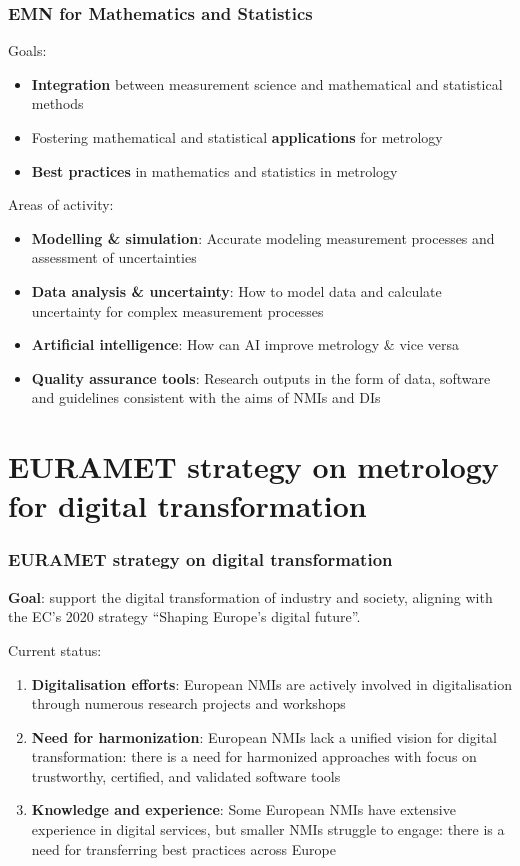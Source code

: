 \documentclass{beamer}
\begin{document}
    \begin{frame}
        \frametitle{EMN for Mathematics and Statistics}
        Goals:
        \begin{itemize}
            \item \textbf{Integration} between measurement science and mathematical and statistical methods
            \item Fostering mathematical and statistical \textbf{applications} for metrology
            \item \textbf{Best practices} in mathematics and statistics in metrology
        \end{itemize}
        Areas of activity:
        \begin{itemize}
            \item \textbf{Modelling \& simulation}: Accurate modeling measurement processes and assessment of uncertainties
            \item \textbf{Data analysis \& uncertainty}: How to model data and calculate uncertainty for complex measurement processes
            \item \textbf{Artificial intelligence}: How can AI improve metrology \& vice versa
            \item \textbf{Quality assurance tools}: Research outputs in the form of data, software and guidelines consistent with the aims of NMIs and DIs
        \end{itemize}
    \end{frame}


    \section{EURAMET strategy on metrology for digital transformation}

    \begin{frame}
        \frametitle{EURAMET strategy on digital transformation}
        \textbf{Goal}: support the digital transformation of industry and society, aligning with the EC's 2020 strategy ``Shaping Europe's digital future''.
        \bigskip

        Current status:
        \begin{enumerate}
            \item \textbf{Digitalisation efforts}: European NMIs are actively involved in digitalisation through numerous research projects and workshops
            \item \textbf{Need for harmonization}: European NMIs lack a unified vision for digital transformation:
            there is a need for harmonized approaches with focus on trustworthy, certified, and validated software tools
            \item \textbf{Knowledge and experience}: Some European NMIs have extensive experience in digital services, but smaller NMIs struggle to engage:
            there is a need for transferring best practices across Europe
        \end{enumerate}
    \end{frame}
\end{document}
